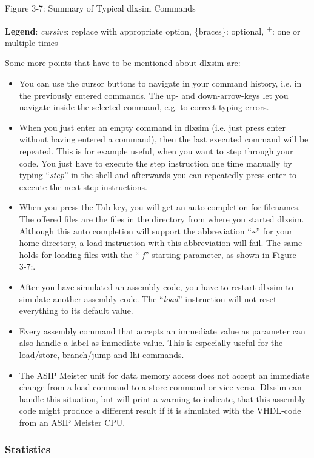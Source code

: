 \documentclass[
]{article}
\begin{document}
Figure 3‑7: Summary of Typical dlxsim Commands

\textbf{Legend}: \emph{cursive}: replace with appropriate option,
\{braces\}: optional, \textsuperscript{+}: one or multiple times

Some more points that have to be mentioned about dlxsim are:

\begin{itemize}
\item
  You can use the cursor buttons to navigate in your command history,
  i.e. in the previously entered commands. The up- and down-arrow-keys
  let you navigate inside the selected command, e.g. to correct typing
  errors.
\item
  When you just enter an empty command in dlxsim (i.e. just press enter
  without having entered a command), then the last executed command will
  be repeated. This is for example useful, when you want to step through
  your code. You just have to execute the step instruction one time
  manually by typing ``\emph{step}'' in the shell and afterwards you can
  repeatedly press enter to execute the next step instructions.
\item
  When you press the Tab key, you will get an auto completion for
  filenames. The offered files are the files in the directory from where
  you started dlxsim. Although this auto completion will support the
  abbreviation ``\emph{\textasciitilde{}}'' for your home directory, a
  load instruction with this abbreviation will fail. The same holds for
  loading files with the ``\emph{-f}'' starting parameter, as shown in
  Figure 3‑7:.
\item
  After you have simulated an assembly code, you have to restart dlxsim
  to simulate another assembly code. The ``\emph{load}'' instruction
  will not reset everything to its default value.
\item
  Every assembly command that accepts an immediate value as parameter
  can also handle a label as immediate value. This is especially useful
  for the load/store, branch/jump and lhi commands.
\item
  The ASIP Meister unit for data memory access does not accept an
  immediate change from a load command to a store command or vice versa.
  Dlxsim can handle this situation, but will print a warning to
  indicate, that this assembly code might produce a different result if
  it is simulated with the VHDL-code from an ASIP Meister CPU.
\end{itemize}

\hypertarget{statistics}{%
\subsubsection{Statistics}\label{statistics}}
\end{document}
